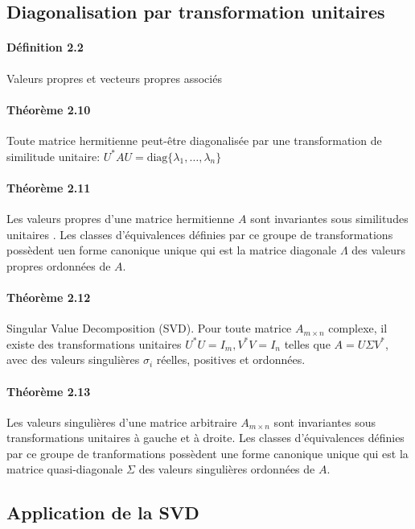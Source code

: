 \subsection{Diagonalisation par transformation unitaires}


\paragraph{Définition 2.2} Valeurs propres et vecteurs propres associés

\paragraph{Théorème 2.10} Toute matrice hermitienne peut-être diagonalisée par une transformation de similitude unitaire: $U^*AU = \text{diag}\{\lambda_1,\dots,\lambda_n\}$

\paragraph{Théorème 2.11} Les valeurs propres d'une matrice hermitienne $A$ sont invariantes sous similitudes unitaires . Les classes d'équivalences définies par ce groupe de transformations possèdent uen forme canonique unique qui est la matrice diagonale $\Lambda$ des valeurs propres ordonnées de $A$.

\paragraph{Théorème 2.12} Singular Value Decomposition (SVD). Pour toute matrice $A_{m\times n}$ complexe, il existe des transformations unitaires $U^*U = I_m, V^*V = I_n$ telles que $A = U \Sigma V^*$, avec des valeurs singulières $\sigma_i$ réelles, positives et ordonnées.

\paragraph{Théorème 2.13} Les valeurs singulières d'une matrice arbitraire $A_{m\times n}$ sont invariantes sous transformations unitaires à gauche et à droite. Les classes d'équivalences définies par ce groupe de tranformations possèdent une forme canonique unique qui est la matrice quasi-diagonale $\Sigma$ des valeurs singulières ordonnées de $A$.

\subsection{Application de la SVD}

